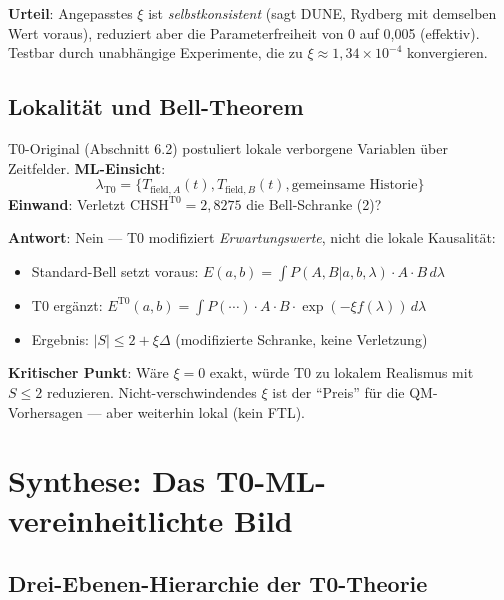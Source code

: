 	\textbf{Urteil}: Angepasstes $\xi$ ist \textit{selbstkonsistent} (sagt DUNE, Rydberg mit demselben Wert voraus), reduziert aber die Parameterfreiheit von 0 auf 0{,}005 (effektiv). Testbar durch unabhängige Experimente, die zu $\xi \approx 1{,}34\times10^{-4}$ konvergieren.
	
	\subsection{Lokalität und Bell-Theorem}
	
	T0-Original (Abschnitt 6.2) postuliert lokale verborgene Variablen über Zeitfelder. \textbf{ML-Einsicht}:
	\begin{equation}
		\lambda_{\text{T0}} = \{T_{\text{field},A}(t), T_{\text{field},B}(t), \text{gemeinsame Historie}\} \tag{ML-Gl.~7.1}
	\end{equation}
	\textbf{Einwand}: Verletzt $\text{CHSH}^{\text{T0}}=2{,}8275$ die Bell-Schranke (2)?
	
	\textbf{Antwort}: Nein --- T0 modifiziert \textit{Erwartungswerte}, nicht die lokale Kausalität:
	\begin{itemize}
		\item Standard-Bell setzt voraus: $E(a,b) = \int P(A,B|a,b,\lambda) \cdot A \cdot B \, d\lambda$
		\item T0 ergänzt: $E^{\text{T0}}(a,b) = \int P(\cdots) \cdot A \cdot B \cdot \exp(-\xi f(\lambda)) \, d\lambda$
		\item Ergebnis: $|S| \leq 2 + \xi\Delta$ (modifizierte Schranke, keine Verletzung)
	\end{itemize}
	\textbf{Kritischer Punkt}: Wäre $\xi=0$ exakt, würde T0 zu lokalem Realismus mit $S\leq2$ reduzieren. Nicht-verschwindendes $\xi$ ist der ``Preis'' für die QM-Vorhersagen --- aber weiterhin lokal (kein FTL).
	
\section{Synthese: Das T0-ML-vereinheitlichte Bild}
	
	\subsection{Drei-Ebenen-Hierarchie der T0-Theorie}
	
